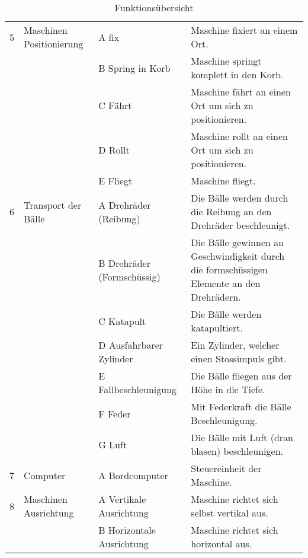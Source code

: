 \begin{table}[h!]
\begin{tabular}{l p{3cm} p{4.5cm} p{8cm}}
	
		
	    5 & Maschinen Positionierung & A fix & Maschine fixiert an einem Ort. \\
		 &  & B Spring in Korb & Maschine springt komplett in den Korb. \\
		 &  & C Fährt & Maschine fährt an einen Ort um sich zu positionieren. \\
		 &  & D Rollt & Maschine rollt an einen Ort um sich zu positionieren. \\
		 &  & E Fliegt & Maschine fliegt. \\
		
	
	    6 & Transport der Bälle & A Drehräder (Reibung) & Die Bälle werden durch die Reibung an den Drehräder beschleunigt. \\
	     &  & B Drehräder (Formschüssig) & Die Bälle gewinnen an Geschwindigkeit durch die formschüssigen Elemente an den Drehrädern.  \\
	     &  & C Katapult & Die Bälle werden katapultiert. \\
	     &  & D Ausfahrbarer Zylinder & Ein Zylinder, welcher einen Stossimpuls gibt.  \\
	     &  & E Fallbeschleunigung & Die Bälle fliegen aus der Höhe in die Tiefe. \\
	     &  & F Feder & Mit Federkraft die Bälle Beschleunigung.  \\
	     &  & G Luft & Die Bälle mit Luft (dran blasen) beschleunigen.  \\
		 
		7 & Computer & A Bordcomputer & Steuereinheit der Maschine. \\
		
	
		
		 8 & Maschinen Ausrichtung & A Vertikale Ausrichtung & Maschine richtet sich selbst vertikal aus. \\
		 &  & B Horizontale Ausrichtung & Maschine richtet sich horizontal aus. \\
		 
	\end{tabular}
	\caption{Funktionsübersicht}
	\label{tab:quelle}
\end{table}